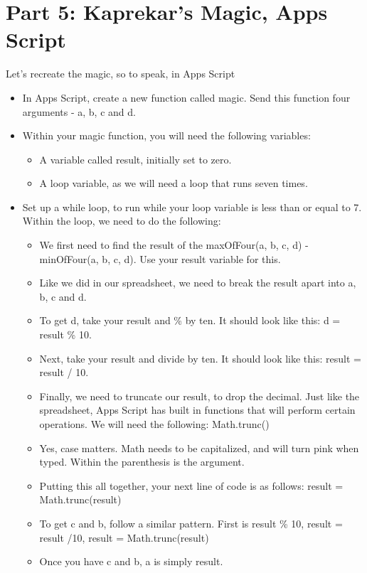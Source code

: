 \documentclass{article}
\begin{document}
\section*{Part 5: Kaprekar's Magic, Apps Script}
Let's recreate the magic, so to speak, in Apps Script
\begin{itemize}
    \item In Apps Script, create a new function called magic.  Send this function four arguments - a, b, c and d.
    \item Within your magic function, you will need the following variables:
    \begin{itemize}
    		\item A variable called result, initially set to zero.
    		\item A loop variable, as we will need a loop that runs seven times.
    	\end{itemize}
    	\item Set up a while loop, to run while your loop variable is less than or equal to 7.  Within the loop, we need to do the following:
    	\begin{itemize}
    		\item We first need to find the result of the maxOfFour(a, b, c, d) - minOfFour(a, b, c, d).  Use your result variable for this.
    		\item Like we did in our spreadsheet, we need to break the result apart into a, b, c and d.
    		\item To get d, take your result and \% by ten.  It should look like this:  d = result \% 10.
    		\item Next, take your result and divide by ten.  It should look like this:  result = result / 10.
    		\item Finally, we need to truncate our result, to drop the decimal.  Just like the spreadsheet, Apps Script has built in functions that will perform certain operations.  We will need the following:  Math.trunc()
    		\item Yes, case matters.  Math needs to be capitalized, and will turn pink when typed.  Within the parenthesis is the argument.
    		\item Putting this all together, your next line of code is as follows:  result = Math.trunc(result)
    		\item To get c and b, follow a similar pattern.  First is result \% 10, result = result /10, result = Math.trunc(result)
    		\item Once you have c and b, a is simply result.

\end{itemize}
\end{itemize}
\end{document}
